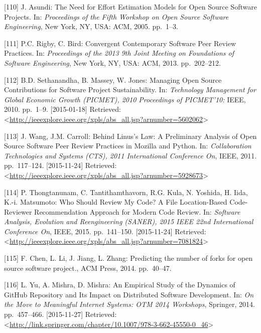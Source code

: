 \documentclass[12pt,magyar,a4paper,oneside]{scrreprt}
\begin{document}
\leavevmode\hypertarget{ref-asundi_need_2005}{}%
{[}110{]} J. Asundi: The Need for Effort Estimation Models for Open
Source Software Projects. In: \emph{Proceedings of the Fifth Workshop on
Open Source Software Engineering}, New York, NY, USA: ACM, 2005.
pp.~1--3.

\leavevmode\hypertarget{ref-rigby_convergent_2013}{}%
{[}111{]} P.C. Rigby, C. Bird: Convergent Contemporary Software Peer
Review Practices. In: \emph{Proceedings of the 2013 9th Joint Meeting on
Foundations of Software Engineering}, New York, NY, USA: ACM, 2013.
pp.~202--212.

\leavevmode\hypertarget{ref-sethanandha_managing_2010}{}%
{[}112{]} B.D. Sethanandha, B. Massey, W. Jones: Managing Open Source
Contributions for Software Project Sustainability. In: \emph{Technology
Management for Global Economic Growth (PICMET), 2010 Proceedings of
PICMET'10:} IEEE, 2010. pp.~1--9. {[}2015-01-18{]} Retrieved:
\textless{}\url{http://ieeexplore.ieee.org/xpls/abs_all.jsp?arnumber=5602062}\textgreater{}

\leavevmode\hypertarget{ref-wang_behind_2011}{}%
{[}113{]} J. Wang, J.M. Carroll: Behind Linus's Law: A Preliminary
Analysis of Open Source Software Peer Review Practices in Mozilla and
Python. In: \emph{Collaboration Technologies and Systems (CTS), 2011
International Conference On}, IEEE, 2011. pp.~117--124. {[}2015-11-24{]}
Retrieved:
\textless{}\url{http://ieeexplore.ieee.org/xpls/abs_all.jsp?arnumber=5928673}\textgreater{}

\leavevmode\hypertarget{ref-thongtanunam_who_2015}{}%
{[}114{]} P. Thongtanunam, C. Tantithamthavorn, R.G. Kula, N. Yoshida,
H. Iida, K.-i. Matsumoto: Who Should Review My Code? A File
Location-Based Code-Reviewer Recommendation Approach for Modern Code
Review. In: \emph{Software Analysis, Evolution and Reengineering
(SANER), 2015 IEEE 22nd International Conference On}, IEEE, 2015.
pp.~141--150. {[}2015-11-24{]} Retrieved:
\textless{}\url{http://ieeexplore.ieee.org/xpls/abs_all.jsp?arnumber=7081824}\textgreater{}

\leavevmode\hypertarget{ref-chen_predicting_2014}{}%
{[}115{]} F. Chen, L. Li, J. Jiang, L. Zhang: Predicting the number of
forks for open source software project., ACM Press, 2014. pp.~40--47.

\leavevmode\hypertarget{ref-yu_empirical_2014}{}%
{[}116{]} L. Yu, A. Mishra, D. Mishra: An Empirical Study of the
Dynamics of GitHub Repository and Its Impact on Distributed Software
Development. In: \emph{On the Move to Meaningful Internet Systems: OTM
2014 Workshops}, Springer, 2014. pp.~457--466. {[}2015-11-27{]}
Retrieved:
\textless{}\url{http://link.springer.com/chapter/10.1007/978-3-662-45550-0_46}\textgreater{}
\end{document}
